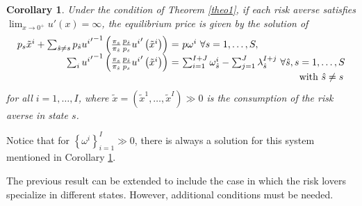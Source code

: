 \documentclass[pdftex]{article}
\numberwithin{equation}{section}
\theoremstyle{th}
\newtheorem{cor}{{Corollary}}%
\newtheorem{proof lemma}{{Proof Lemma}.}
\theoremstyle{definition}
\newtheorem*{risk lovers}{Risk lovers}
\newtheorem*{risk averse}{Risk averse}
\begin{document}
\begin{cor}\label{cor3}
Under the condition of Theorem \ref{theo1}, if each risk averse satisfies $\lim_{x\rightarrow0^+}u'(x)=\infty$, the equilibrium price is given by the solution of
\[
\begin{array}{rcl}
p_s\tilde{x}^i+\sum_{\hat{s}\neq{s}}p_{\hat{s}}{{u^i}'}^{-1}\left(\frac{\pi_s}{\pi_{\hat{s}}}\frac{p_{\hat{s}}}{p_s}{u^i}'\left(\tilde{x}^i\right)\right)\!\! & \!\!=\!\! & \!\!p\omega^i\ \forall s=1,\dots,S,\\
\ \ \ \ \ \ \ \ \ \ \ \ \ \ \,\sum_i{{u^i}'}^{-1}\left(\frac{\pi_s}{\pi_{\hat{s}}}\frac{p_{\hat{s}}}{p_s}{u^i}'\left(\tilde{x}^i\right)\right)\!\! & \!\!=\!\! & \!\!\sum_{i=1}^{I+J}\omega_{\hat{s}}^i-\sum_{j=1}^J\lambda^{I+j}_{\hat{s}}\ \forall\hat{s},{s}=1,\dots,S \\ & & \textnormal{\hspace{4cm} with }\hat{s}\neq{s} \end{array}
\]
for all $i=1,\dots,I$, where $\tilde{x}=\left(\tilde{x}^1,\dots,\tilde{x}^I\right)\gg0$ is the consumption of the risk averse in state $s$.%
\end{cor}

Notice that for $\left\{\omega^i\right\}_{i=1}^I\gg0$, there is always a solution for this system mentioned in Corollary \ref{cor3}.

The previous result can be extended to include the case in which the risk lovers specialize in different states. However, additional conditions must be needed.%
\end{document}
